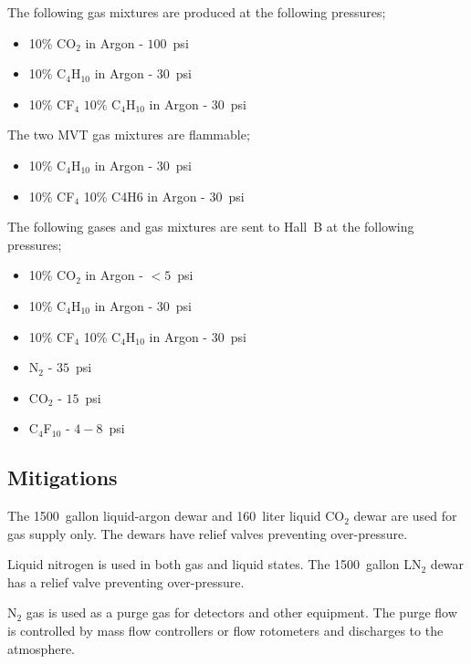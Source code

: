 The following gas mixtures are produced at the following pressures;

\begin{itemize}
\item 10\% CO$_2$ in Argon - $100$~psi
\item 10\% C$_4$H$_{10}$ in Argon - $30$~psi
\item 10\% CF$_4$ $10\%$ C$_4$H$_{10}$ in Argon - $30$~psi
\end{itemize}

The two MVT gas mixtures are flammable;

\begin{itemize}
\item 10\% C$_4$H$_{10}$ in Argon - $30$~psi
\item 10\% CF$_4$ 10\% C4H6 in Argon - $30$~psi
\end{itemize}

The following gases and gas mixtures are sent to Hall~B at the following pressures;

\begin{itemize}
\item 10\% CO$_2$ in Argon - $<5$~psi
\item 10\% C$_4$H$_{10}$ in Argon - $30$~psi
\item 10\% CF$_4$ 10\% C$_4$H$_{10}$ in Argon - $30$~psi
\item N$_2$ - $35$~psi
\item CO$_2$ - $15$~psi
\item C$_4$F$_{10}$ - $4 - 8$~psi
\end{itemize}

\subsection{Mitigations}

The 1500~gallon liquid-argon dewar and 160~liter liquid CO$_2$ dewar are used for gas supply 
only. The dewars have relief valves preventing over-pressure.

Liquid nitrogen is used in both gas and liquid states. The 1500~gallon LN$_2$ dewar has a 
relief valve preventing over-pressure. 

N$_2$ gas is used as a purge gas for detectors and other equipment. The purge flow is 
controlled by mass flow controllers or flow rotometers and discharges to the atmosphere.

